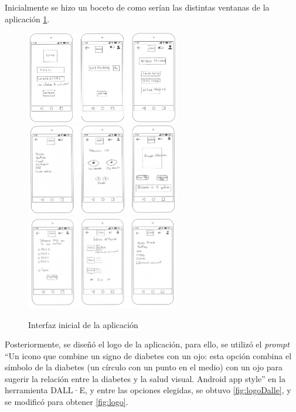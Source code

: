 Inicialmente se hizo un boceto de como serían las distintas ventanas de la aplicación \ref{fig:interfazInicial}.

        \begin{figure}[!ht]
                 \centering
                 \includegraphics[width=0.6\textwidth]{img/Interfaz1.png}
                 \centering
                 \includegraphics[width=0.6\textwidth]{img/Interfaz2.png}
                 \centering
                 \includegraphics[width=0.6\textwidth]{img/Interfaz3.png}
                  \caption{Interfaz inicial de la aplicación}
                 \label{fig:interfazInicial}
        \end{figure}
        
    Posteriormente, se diseñó el logo de la aplicación, para ello, se utilizó el \textit{prompt} ``Un icono que combine un signo de diabetes con un ojo: esta opción combina el símbolo de la diabetes (un círculo con un punto en el medio) con un ojo para sugerir la relación entre la diabetes y la salud visual. Android app style'' en la herramienta DALL·E, y entre las opciones elegidas, se obtuvo \ref{fig:logoDalle}, y se modificó para obtener \ref{fig:logo}. 

